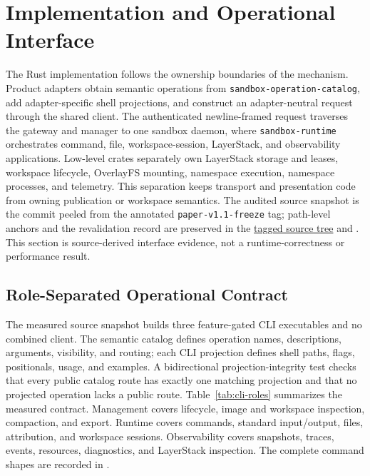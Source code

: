 \section{Implementation and Operational Interface}
\label{sec:implementation-interface}

The Rust implementation follows the ownership boundaries of the mechanism.
Product adapters obtain semantic operations from
\texttt{sandbox-operation-catalog}, add adapter-specific shell projections,
and construct an adapter-neutral request through the shared client.  The
authenticated newline-framed request traverses the gateway and manager to one
sandbox daemon, where \texttt{sandbox-runtime} orchestrates command, file,
workspace-session, LayerStack, and observability applications.  Low-level
crates separately own LayerStack storage and leases, workspace lifecycle,
OverlayFS mounting, namespace execution, namespace processes, and telemetry.
This separation keeps transport and presentation code from owning publication
or workspace semantics. The audited source snapshot is the commit peeled from
the annotated \texttt{paper-v1.1-freeze} tag; path-level anchors and the
revalidation record are preserved in the
\href{https://github.com/Ephemeral-AI-Lab/ephemeral-sandbox/tree/5c48dae10847fb9e46ba2bea7675bcf2f5a6f4c8}{tagged source tree}
and . This section is source-derived
interface evidence, not a runtime-correctness or performance result.

\subsection{Role-Separated Operational Contract}

The measured source snapshot builds three feature-gated CLI executables and no combined
client.  The semantic catalog defines operation names, descriptions,
arguments, visibility, and routing; each CLI projection defines shell paths,
flags, positionals, usage, and examples.  A bidirectional projection-integrity
test checks that every public catalog route has exactly one matching projection
and that no projected operation lacks a public route.  Table~\ref{tab:cli-roles}
summarizes the measured contract. Management covers lifecycle, image and
workspace inspection, compaction, and export. Runtime covers commands,
standard input/output, files, attribution, and workspace sessions.
Observability covers snapshots, traces, events, resources, diagnostics, and
LayerStack inspection. The complete command shapes are recorded in
.

